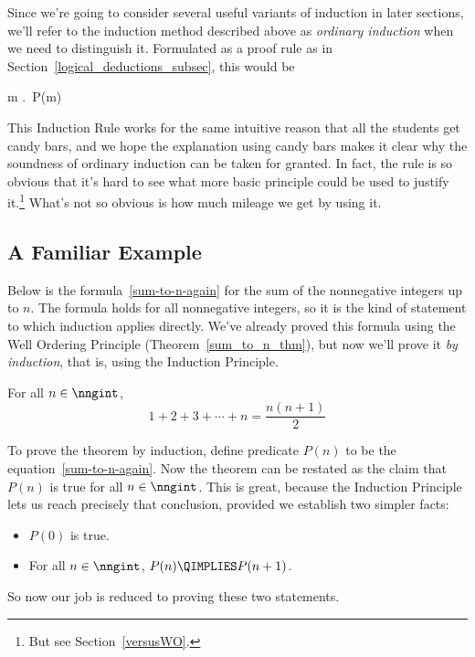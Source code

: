 Since we're going to consider several useful variants of induction in
later sections, we'll refer to the induction method described above as
\emph{ordinary induction} when we need to distinguish it.  Formulated
as a proof rule as in Section~\ref{logical_deductions_subsec}, this
would be
\begin{rul*} 
{\forall m \in \nngint.\, P(m)}
\end{rul*}

This Induction Rule works for the same intuitive reason that all
the students get candy bars, and we hope the explanation using candy bars
makes it clear why the soundness of ordinary induction can be taken
for granted.  In fact, the rule is so obvious that it's hard to see what
more basic principle could be used to justify it.\footnote{But see
Section~\ref{versusWO}.}  What's not so obvious is how much mileage 
we get by using it.

\subsection{A Familiar Example}

Below is the formula~\eqref{sum-to-n-again} for the sum of the
nonnegative integers up to $n$.  The formula holds for all nonnegative
integers, so it is the kind of statement to which induction applies
directly.  We've already proved this formula using the Well
  Ordering Principle (Theorem~\ref{sum_to_n_thm}), but now we'll
prove it \emph{by induction}, that is, using the Induction Principle.
\begin{theorem}\label{sum-to-n-again-theorem}
For all $n \in \nngint$,
\begin{equation}\label{sum-to-n-again}
1 + 2 + 3 + \cdots + n = \frac{n(n+1)}{2}
\end{equation}
\end{theorem}

To prove the theorem by induction, define predicate $P(n)$ to be the
equation~\eqref{sum-to-n-again}.  Now the theorem can be restated as
the claim that $P(n)$ is true for all $n \in \nngint$.  This is
great, because the Induction Principle lets us reach precisely that
conclusion, provided we establish two simpler facts:
\begin{itemize}
\item $P(0)$ is true.
\item For all $n \in \nngint$, $P(n) \QIMPLIES P(n+1)$.
\end{itemize}
So now our job is reduced to proving these two statements.

